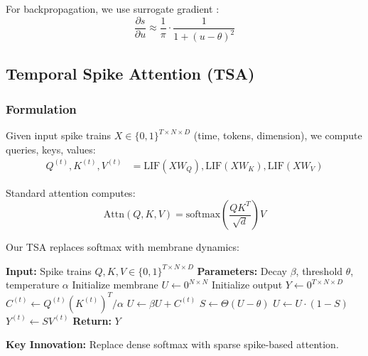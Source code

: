 \documentclass{article}
\begin{document}
For backpropagation, we use surrogate gradient \cite{neftci2019surrogate}:
\begin{equation}
    \frac{\partial s}{\partial u} \approx \frac{1}{\pi} \cdot \frac{1}{1 + (u - \theta)^2}
\end{equation}

\subsection{Temporal Spike Attention (TSA)}

\subsubsection{Formulation}

Given input spike trains $X \in \{0,1\}^{T \times N \times D}$ (time, tokens, dimension), we compute queries, keys, values:
\begin{align}
    Q^{(t)}, K^{(t)}, V^{(t)} &= \text{LIF}(XW_Q), \text{LIF}(XW_K), \text{LIF}(XW_V)
\end{align}

Standard attention computes:
\begin{equation}
    \text{Attn}(Q,K,V) = \text{softmax}\left(\frac{QK^T}{\sqrt{d}}\right)V
\end{equation}

Our TSA replaces softmax with membrane dynamics:

\begin{algorithm}[H]
\caption{Temporal Spike Attention (TSA)}
\label{alg:tsa}
\begin{algorithmic}[1]
\STATE \textbf{Input:} Spike trains $Q, K, V \in \{0,1\}^{T \times N \times D}$
\STATE \textbf{Parameters:} Decay $\beta$, threshold $\theta$, temperature $\alpha$
\STATE Initialize membrane $U \leftarrow 0^{N \times N}$
\STATE Initialize output $Y \leftarrow 0^{T \times N \times D}$
    \STATE $C^{(t)} \leftarrow Q^{(t)} (K^{(t)})^T / \alpha$ 
    \STATE $U \leftarrow \beta U + C^{(t)}$ 
    \STATE $S \leftarrow \Theta(U - \theta)$ 
    \STATE $U \leftarrow U \cdot (1 - S)$ 
    \STATE $Y^{(t)} \leftarrow S V^{(t)}$ 
\ENDFOR
\STATE \textbf{Return:} $Y$
\end{algorithmic}
\end{algorithm}

\textbf{Key Innovation:} Replace dense softmax with sparse spike-based attention.
\end{document}
